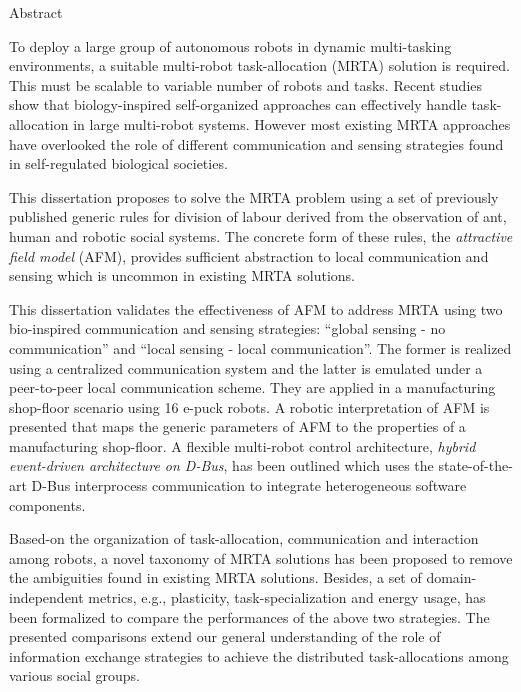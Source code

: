 \begin{Large}
\noindent
Abstract\\
\end{Large}
\newline
To deploy a large group of autonomous robots in dynamic multi-tasking environments, a suitable multi-robot task-allocation (MRTA) solution is required. This must be scalable to variable number of robots and tasks. Recent studies show that biology-inspired self-organized approaches can effectively handle task-allocation in large multi-robot systems. However most existing MRTA approaches have overlooked the role of different communication and sensing strategies found in self-regulated biological societies.

This dissertation proposes to solve the MRTA problem using a set of previously published generic rules for division of labour derived from the observation of ant, human and robotic social systems. The concrete form of these rules, the \textit{attractive field model} (AFM), provides sufficient abstraction to local communication and sensing which is uncommon in existing MRTA solutions. 

This dissertation validates the effectiveness of AFM to address MRTA  using two bio-inspired communication and sensing strategies: ``global sensing - no communication'' and ``local sensing - local communication''. The former is realized using a centralized communication system and the latter is emulated under a peer-to-peer local communication scheme. They are applied in a  manufacturing shop-floor scenario using 16 e-puck robots. A robotic interpretation of AFM is presented that maps the generic parameters of AFM to the properties of a manufacturing shop-floor. A flexible multi-robot control architecture, \textit{hybrid event-driven architecture on D-Bus}, has been outlined which uses the state-of-the-art D-Bus interprocess communication  to integrate heterogeneous software components. 

Based-on the organization of task-allocation, communication and interaction among robots, a  novel taxonomy of MRTA solutions has been proposed to remove the ambiguities found in existing MRTA solutions. Besides, a set of domain-independent metrics, e.g., plasticity, task-specialization and energy usage, has been formalized to compare the performances of the above two strategies. The presented comparisons extend our general understanding of the role of information exchange strategies to achieve the distributed task-allocations among various social groups.